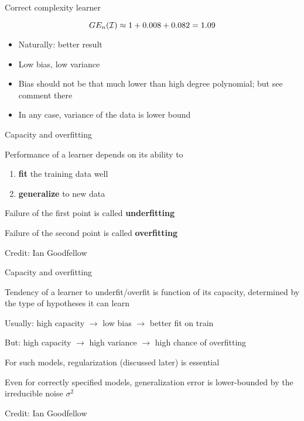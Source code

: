 \documentclass[11pt,compress,t,notes=noshow, xcolor=table]{beamer}
\begin{document}
\begin{frame}{Correct complexity learner}

\splitVThree
{}
{}
{}

\vfill

$$GE_n(\mathcal{I}) \approx 1 + 0.008 + 0.082 = 1.09 $$

\begin{itemize}
\item Naturally: better result
\item Low bias, low variance
\item Bias should not be that much lower than
high degree polynomial; but see comment there
\item In any case, variance of the data is lower bound
\end{itemize}

\end{frame}

\begin{framei}[sep=L]{Capacity and overfitting}

\item Performance of a learner depends on its ability to 
\begin{enumerate}
\item \textbf{fit} the training data well
\item \textbf{generalize} to new data
\end{enumerate}  
\item Failure of the first point is called \textbf{underfitting}
\item Failure of the second point is called \textbf{overfitting}

\tiny \centering
Credit: Ian Goodfellow

\end{framei}

\begin{framei}[sep=M]{Capacity and overfitting}

\item Tendency of a learner to underfit/overfit is function of its capacity, determined by the type of hypotheses it can learn
\item Usually: high capacity $\rightarrow$ low bias $\rightarrow$ better fit on train
\item But: high capacity $\rightarrow$ high variance $\rightarrow$ high chance of overfitting
\item For such models, regularization (discussed later) is essential
\item Even for correctly specified models, generalization error is lower-bounded by the irreducible noise $\sigma^2$

\tiny \centering
Credit: Ian Goodfellow

\end{framei}

\endlecture
\end{document}
